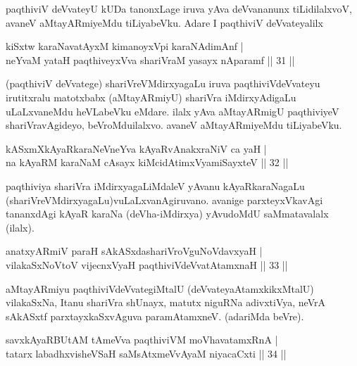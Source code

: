 \begin{artha}
paqthiviV deVvateyU kUDa tanonxLage iruva yAva deVvananunx tiLidilalxvoV, avaneV aMtayARmiyeMdu tiLiyabeVku. Adare I paqthiviV deVvateyalilx
\end{artha}


\begin{shl}
kiSxtw karaNavatAyxM kimanoyxV\s pi karaNAdimAnf |\\
neYvaM yataH paqthiveyxVva shariVraM yasayx nAparamf \hfill || 31 ||
\end{shl}

\begin{artha}
(paqthiviV deVvatege) shariVreVMdirxyagaLu iruva paqthiviV\break deVvateyu irutitxralu matotxbabx (aMtayARmiyU) shariVra iMdirxyAdigaLu uLaLxvaneMdu heVLabeVku eMdare. ilalx yAva aMtayARmigU paqthiviyeV shariVravAgideyo, beVroMdu\break ilalxvo. avaneV aMtayARmiyeMdu tiLiyabeVku.
\end{artha}

\begin{shl}
kASxmXkAyaRkaraNeVneYva kAyaRvAnakxraNiV ca yaH |\\
na kAyaRM karaNaM cAsayx kiMcidAtimxVyamiSayxteV \hfill || 32 ||
\end{shl}

\begin{artha}
paqthiviya shariVra iMdirxyagaLiMdaleV yAvanu kAyaRkaraNagaLu (shariVreVMdirxyagaLu)vuLaLxvanAgiruvano. avanige parxteyxVkavAgi tananxdAgi kAyaR karaNa (deVha-iMdirxya) yAvudoMdU saMmatavalalx (ilalx).
\end{artha}


\begin{shl}
anatxyARmiV paraH sAkASxdashariVroV\s guNoV\s davxyaH |\\
vilakaSxNoV\s toV vijecnxVyaH paqthiviVdeVvatAtamxnaH \hfill || 33 ||
\end{shl}

\begin{artha}
aMtayARmiyu paqthiviVdeVvategiMtalU (deVvateya\break AtamxkikxMtalU) vilakaSxNa, Itanu shariVra shUnayx, matutx niguRNa adivxtiVya, neVrA  sAkASxtf parxtayxkaSxvAguva paramAtamxneV. (adariMda beVre).
\end{artha}

\begin{shl}
savxkAyaRBUtAM tAmeVva paqthiviVM moVhavatamxRnA |\\
tatarx labadhxvisheVSaH saMsAtxmeVvAyaM niyacaCxti \hfill || 34 ||
\end{shl}

